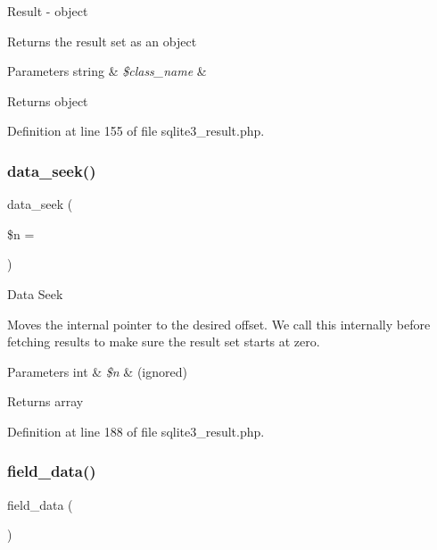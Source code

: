 Result -\/ object

Returns the result set as an object


\begin{DoxyParams}[1]{Parameters}
string & {\em \$class\+\_\+name} & \\
\hline
\end{DoxyParams}
\begin{DoxyReturn}{Returns}
object 
\end{DoxyReturn}


Definition at line 155 of file sqlite3\+\_\+result.\+php.

\mbox{\label{class_c_i___d_b__sqlite3__result_a8255ae91816e4206e29eb7581c5af0f1}} 
\subsubsection{\texorpdfstring{data\_seek()}{data\_seek()}}
{\footnotesize\ttfamily data\+\_\+seek (\begin{DoxyParamCaption}\item[{}]{\$n = {} }\end{DoxyParamCaption})}

Data Seek

Moves the internal pointer to the desired offset. We call this internally before fetching results to make sure the result set starts at zero.


\begin{DoxyParams}[1]{Parameters}
int & {\em \$n} & (ignored) \\
\hline
\end{DoxyParams}
\begin{DoxyReturn}{Returns}
array 
\end{DoxyReturn}


Definition at line 188 of file sqlite3\+\_\+result.\+php.

\mbox{\label{class_c_i___d_b__sqlite3__result_a84bffd65e53902ade1591716749a33e3}} 
\subsubsection{\texorpdfstring{field\_data()}{field\_data()}}
{\footnotesize\ttfamily field\+\_\+data (\begin{DoxyParamCaption}{ }\end{DoxyParamCaption})}

